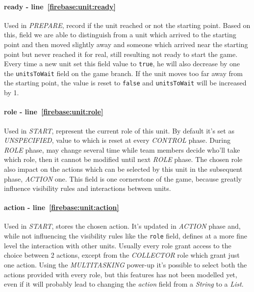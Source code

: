 				\paragraph{ready - line~\ref{firebase:unit:ready}}
				Used in \emph{PREPARE}, record if the unit reached or not the starting point. Based on this, field we are able to distinguish from a unit which arrived to the starting point and then moved slightly away and someone which arrived near the starting point but never reached it for real, still resulting not ready to start the game. Every time a new unit set this field value to \lstinline|true|, he will also decrease by one the \lstinline|unitsToWait| field on the game branch.
				If the unit moves too far away from the starting point, the value is reset to \lstinline|false| and \lstinline|unitsToWait| will be increased by 1. 
				
				\paragraph{role - line~\ref{firebase:unit:role}}
				Used in \emph{START}, represent the current role of this unit. By default it's set as \emph{UNSPECIFIED}, value to which is reset at every \emph{CONTROL} phase.
				During \emph{ROLE} phase, may change several time while team members decide who'll take which role, then it cannot be modified until next \emph{ROLE} phase.
				The chosen role also impact on the actions which can be selected by this unit in the subsequent phase, \emph{ACTION} one.
				This field is one cornerstone of the game, because greatly influence visibility rules and interactions between units.
				
				\paragraph{action - line~\ref{firebase:unit:action}}
				Used in \emph{START}, stores the chosen action. It's updated in \emph{ACTION} phase and, while not influencing the visibility rules like the \lstinline|role| field, defines at a more fine level the interaction with other units. Usually every role grant access to the choice between 2 actions, except from the \emph{COLLECTOR} role which grant just one action. Using the \emph{MULTITASKING} power-up it's possible to select both the actions provided with every role, but this features has not been modelled yet, even if it will probably lead to changing the \emph{action} field from a \emph{String} to a \emph{List}.
				
